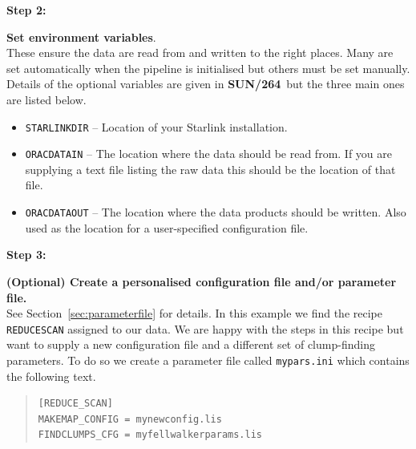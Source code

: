 \documentclass[twoside,11pt]{article}
\newcommand{\htmlref}[2]{#1}
\newcommand{\latexhtml}[2]{#1}
\newcommand{\xref}[3]{#1}
\renewcommand{\_}{\texttt{\symbol{95}}}
\newcommand{\drrecipe}[1]{\texttt{#1}}
\newcommand{\envvar}[1]{\texttt{#1}}
\newcommand{\file}[1]{\texttt{#1}}
\newcommand{\pipelinesun}{\xref{\textbf{SUN/264}}{sun264}{}}
\newcommand{\cref}[3]{\latexhtml{#1~\ref{#2}}{\htmlref{#3}{#2}}}
\begin{document}
\begin{minipage}[t]{0.15\linewidth}
\textbf{Step 2:}
\end{minipage}
\begin{minipage}[t]{0.85\linewidth}
\textbf{Set environment variables}. \\These ensure the data are read
from and written to the right places. Many are set automatically when
the pipeline is initialised but others must be set manually. Details
of the optional variables are given in \pipelinesun\ but the three
main ones are listed below.
\begin{itemize}\itemsep-0.1em
\item \envvar{STARLINK\_DIR} -- Location of your Starlink installation.
\item \envvar{ORAC\_DATA\_IN} -- The location where the data should be read from.
If you are supplying a text file listing the raw data this should be the
location of that file.
\item \envvar{ORAC\_DATA\_OUT} -- The location where the data products should be
written. Also used as the location for a user-specified configuration file.\\
\end{itemize}
\end{minipage}

\begin{minipage}[t]{0.15\linewidth}
\textbf{Step 3:}
\end{minipage}
\begin{minipage}[t]{0.85\linewidth}
\textbf{(Optional) Create a personalised configuration file and/or parameter file.} \\
See \cref{Section}{sec:parameterfile}{Changing the defaults} for
details. In this example we find the recipe \drrecipe{REDUCE\_SCAN}
assigned to our data. We are happy with the steps in this recipe but
want to supply a new configuration file and a different set of
clump-finding parameters. To do so we create a parameter file called
\file{mypars.ini} which contains the following text.

\begin{quote}
\begin{verbatim}
[REDUCE_SCAN]
MAKEMAP_CONFIG = mynewconfig.lis
FINDCLUMPS_CFG = myfellwalkerparams.lis

\end{verbatim}
\end{quote}

\end{minipage}
\end{document}
